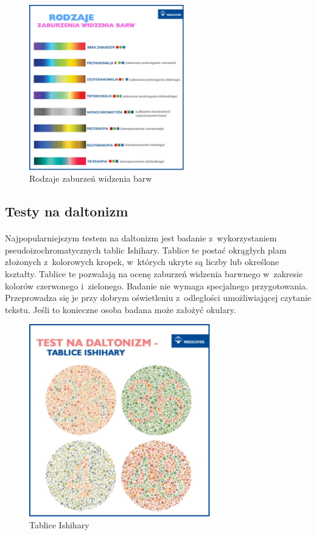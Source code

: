 \documentclass[12pt, letterpaper]{article}
\begin{document}
\begin{figure}[h]
  \centering
      \includegraphics[width=0.6\textwidth]{daltonizm_rodzaje}
  \caption{Rodzaje zaburzeń widzenia barw}
\end{figure}

\subsection{Testy na daltonizm}
\paragraph{}
Najpopularniejszym testem na daltonizm jest badanie z~wykorzystaniem pseudoizochromatycznych tablic Ishihary. Tablice te postać okrągłych plam złożonych z~kolorowych kropek, w~których ukryte są liczby lub określone kształty. Tablice te pozwalają na ocenę zaburzeń widzenia barwnego w~zakresie kolorów czerwonego i~zielonego. Badanie nie wymaga specjalnego przygotowania. Przeprowadza się je przy dobrym oświetleniu z~odległości umożliwiającej czytanie tekstu. Jeśli to konieczne osoba badana może założyć okulary.

\begin{figure}[h]
  \centering
      \includegraphics[width=0.7\textwidth]{ishihara}
  \caption{Tablice Ishihary}
\end{figure}
\end{document}
